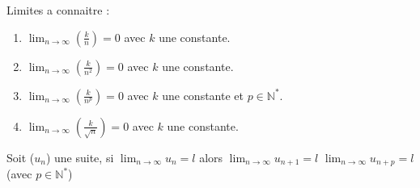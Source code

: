 \documentclass[a4paper,10pt]{book}
\begin{document}
	\begin{prop}
		Limites a connaitre : \\
		\begin{enumerate}
			\item $ \lim_{n \rightarrow \infty}(\frac{k}{n}) = 0$ avec $k$ une constante.
			\item $ \lim_{n \rightarrow \infty}(\frac{k}{n^2}) = 0$ avec $k$ une constante.
			\item $ \lim_{n \rightarrow \infty}(\frac{k}{n^p}) = 0$ avec $k$ une constante et $p \in \mathbb{N}^*$.
			\item $ \lim_{n \rightarrow \infty}(\frac{k}{\sqrt{n}}) = 0$ avec $k$ une constante.
		\end{enumerate}
	\end{prop}

	\begin{prop}
		Soit ($u_n$) une suite, si $\lim_{n \rightarrow \infty}u_n = l$ alors $\lim_{n \rightarrow \infty}u_{n+1} = l$ $\lim_{n \rightarrow \infty}u_{n+p} = l$ (avec $p \in \mathbb{N}^*$)
	\end{prop}
\end{document}
